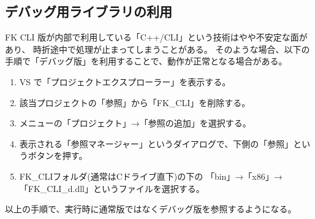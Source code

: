 \documentclass[a4paper]{jsarticle}
\begin{document}
\subsection{デバッグ用ライブラリの利用}
FK CLI 版が内部で利用している「C++/CLI」という技術はやや不安定な面があり、
時折途中で処理が止まってしまうことがある。
そのような場合、以下の手順で「デバッグ版」を利用することで、動作が正常となる場合がある。
\begin{enumerate}
 \item VS で「プロジェクトエクスプローラー」を表示する。
 \item 該当プロジェクトの「参照」から「FK\_CLI」を削除する。
 \item メニューの「プロジェクト」→「参照の追加」を選択する。
 \item 表示される「参照マネージャー」というダイアログで、下側の「参照」というボタンを押す。
 \item FK\_CLIフォルダ(通常はCドライブ直下)の下の
	「bin」→「x86」→「FK\_CLI\_d.dll」というファイルを選択する。
\end{enumerate}
以上の手順で、実行時に通常版ではなくデバッグ版を参照するようになる。
\end{document}
